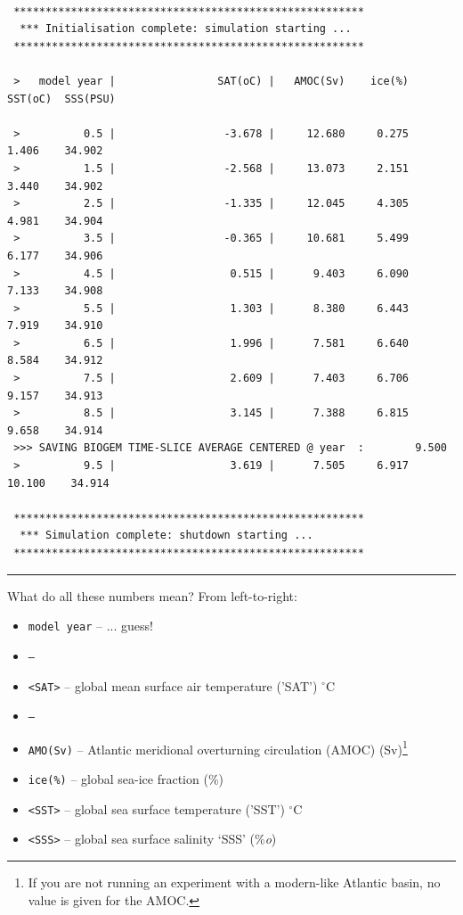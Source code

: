 \vspace{-2mm}\footnotesize\begin{verbatim}

 *******************************************************
  *** Initialisation complete: simulation starting ...
 *******************************************************

 >   model year |                SAT(oC) |   AMOC(Sv)    ice(%)   SST(oC)  SSS(PSU)
  
 >          0.5 |                 -3.678 |     12.680     0.275     1.406    34.902
 >          1.5 |                 -2.568 |     13.073     2.151     3.440    34.902
 >          2.5 |                 -1.335 |     12.045     4.305     4.981    34.904
 >          3.5 |                 -0.365 |     10.681     5.499     6.177    34.906
 >          4.5 |                  0.515 |      9.403     6.090     7.133    34.908
 >          5.5 |                  1.303 |      8.380     6.443     7.919    34.910
 >          6.5 |                  1.996 |      7.581     6.640     8.584    34.912
 >          7.5 |                  2.609 |      7.403     6.706     9.157    34.913
 >          8.5 |                  3.145 |      7.388     6.815     9.658    34.914
 >>> SAVING BIOGEM TIME-SLICE AVERAGE CENTERED @ year  :        9.500
 >          9.5 |                  3.619 |      7.505     6.917    10.100    34.914

 *******************************************************
  *** Simulation complete: shutdown starting ...
 *******************************************************

\end{verbatim}\normalsize\vspace{-2mm}

\vspace{1mm}\noindent\rule{4cm}{0.5pt}\vspace{2mm}

\noindent What do all these numbers mean? From left-to-right:

\vspace{1mm}\begin{itemize}
\item[] \texttt{model year}  -- ... guess!
\item[] \texttt{---}
\item[] \texttt{<SAT>} -- global mean surface air temperature ('SAT') $^{\circ}$C
\item[] \texttt{---}
\item[] \texttt{AMO(Sv)} -- Atlantic meridional overturning circulation (AMOC) (Sv)\footnote{If you are not running an experiment with a modern-like Atlantic basin, no value is given for the AMOC.} 
\item[] \texttt{ice(\%)} -- global sea-ice fraction (\%)
\item[] \texttt{<SST>} -- global sea surface temperature ('SST') $^{\circ}$C
\item[] \texttt{<SSS>} -- global sea surface salinity ‘SSS’ (\%\textit{o})
\end{itemize}\vspace{1mm}

